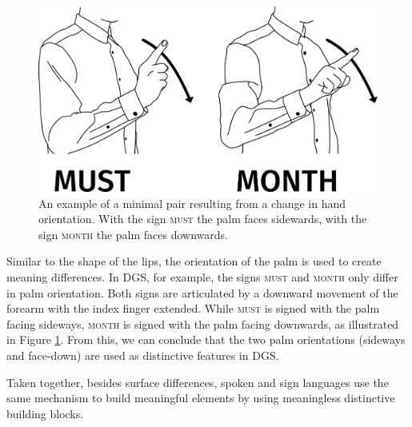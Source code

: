 \begin{figure}[bt]
\centering
	\includegraphics[width=1.0\textwidth]{minimalpair1}
	\caption{An example of a minimal pair resulting from a change in hand orientation. With the sign \textsc{must} the palm faces sidewards, with the sign \textsc{month} the palm faces downwards.}
	\label{minimalpairone}
\end{figure}

Similar to the shape of the lips, the orientation of the palm is used to create meaning differences. In DGS, for example, the signs \textsc{must} and \textsc{month} only differ in palm orientation. Both signs are articulated by a downward movement of the forearm with the index finger extended.  While \textsc{must} is signed with the palm facing sideways, \textsc{month} is signed with the palm facing downwards, as illustrated in Figure \ref{minimalpairone}. From this, we can conclude that the two palm orientations (sideways and face-down) are used as distinctive features in DGS.

Taken together, besides surface differences, spoken and sign languages use the same mechanism to build meaningful elements by using meaningless distinctive building blocks. 



